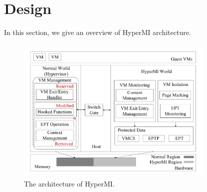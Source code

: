 \documentclass[conference]{IEEEtran}
\begin{document}
\section{Design}\label{sec:design}
In this section, we give an overview of HyperMI architecture.%
\begin{figure}
\centerline{\includegraphics[width=9.5cm, height=7cm]{pdfvmcs1.pdf}}%
\caption{The architecture of HyperMI. } \label{fig1}
\end{figure}
\end{document}

